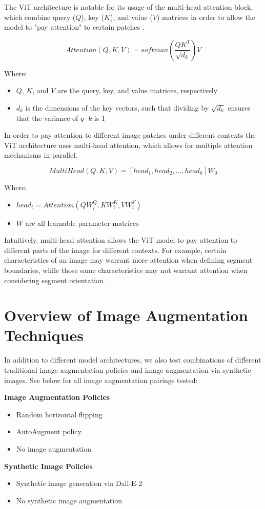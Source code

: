 \documentclass [MAS] {uclathes}
\begin{document}
The ViT architecture is notable for its usage of the multi-head attention block, which combine query (\(Q\)), key 
(\(K\)), and value (\(V\)) matrices in order to allow the model to "pay attention" to certain patches \cite{dot}. 

\[Attention(Q,K,V) = softmax(\frac{QK^T}{\sqrt{d_k}})V\]

Where:
\begin{itemize}
    \item \(Q\), \(K\), and \(V\) are the query, key, and value matrices, respectively
    \item \(d_k\) is the dimensions of the key vectors, such that dividing by \(\sqrt{d_k}\) ensures that the variance 
    of \(q \cdot k\) is 1
\end{itemize}

In order to pay attention to different image patches under different contexts the ViT architecture uses multi-head 
attention, which allows for multiple attention mechanisms in parallel. 

\[MultiHead(Q,K,V) = [head_1, head_2, ... , head_h]W_0\]

Where:
\begin{itemize}
    \item \(head_i = Attention(QW_i^Q, KW_i^K, VW_i^V)\)
    \item \(W\) are all learnable parameter matrices
\end{itemize}

Intuitively, multi-head attention allows the ViT model to pay attention to different parts of the image for different 
contexts. For example, certain characteristics of an image may warrant more attention when defining segment boundaries, 
while those same characteristics may not warrant attention when considering segment orientation \cite{att}.

\chapter{Overview of Image Augmentation Techniques}
In addition to different model architectures, we also test combinations of different traditional image augmentation 
policies and image augmentation via synthetic images. See below for all image augmentation pairings tested:

\begin{multicols}{2}
    \raggedcolumns
    \textbf{Image Augmentation Policies}
    \begin{itemize}
        \item Random horizontal flipping
        \item AutoAugment policy
        \item No image augmentation
    \end{itemize}
    
    \columnbreak
    
    \textbf{Synthetic Image Policies}
    \begin{itemize}
        \item Synthetic image generation via Dall-E-2
        \item No synthetic image augmentation
    \end{itemize}
\end{multicols}
\end{document}
